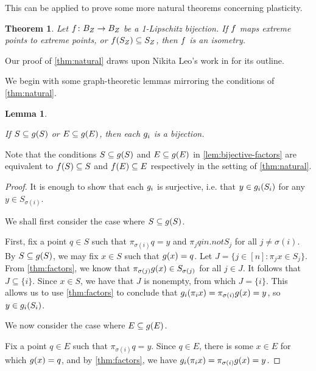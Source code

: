 \documentclass{amsart}
\newtheorem{theorem}{Theorem}[section]
\newtheorem{lemma}{Lemma}[section]
\theoremstyle{definition}
\begin{document}
This can be applied to prove some more natural theorems concerning plasticity.

\begin{theorem} \label{thm:natural}
\annotation
  Let $f\colon B_Z \to B_Z$ be a 1-Lipschitz bijection. If $f$ maps extreme points to extreme points, or $f(S_Z) \subseteq S_Z$, then $f$ is an isometry.
\end{theorem}

Our proof of \autoref{thm:natural} draws upon Nikita Leo's work in \autocite{haller:2022}
for its outline.

We begin with some graph-theoretic lemmas mirroring the conditions of \autoref{thm:natural}.

\begin{lemma} \label{lem:bijective-factors}

  If $S \subseteq g(S)$ or $E \subseteq g(E)$, then each $g_i$ is a bijection.
\end{lemma}

Note that the conditions $S \subseteq g(S)$ and $E \subseteq g(E)$ in \autoref{lem:bijective-factors} are equivalent to $f(S) \subseteq S$ and $f(E) \subseteq E$ respectively in the setting of \autoref{thm:natural}.

\begin{proof} 

  It is enough to show that each $g_i$ is surjective, i.e. that $y \in g_i (S_i)$ for any $y \in S_{\sigma(i)}$.

  We shall first consider the case where $S \subseteq g(S)$.

  First, fix a point $q \in S$ such that $\pi_{\sigma(i)} q = y$ and $\pi_j q in.not S_j$ for all $j \neq \sigma(i)$. By $S \subseteq g(S)$, we may fix $x \in S$ such that $g(x) = q$. Let $J = \{j \in [n] \colon \pi_j x \in S_j\}$. From  \autoref{thm:factors}, we know that $\pi_{\sigma(j)} g(x) \in S_{\sigma(j)}$ for all $j \in J$. It follows that $J \subseteq \{i\}$. Since $x \in S$, we have that $J$ is nonempty, from which $J = \{i\}$. This allows us to use  \autoref{thm:factors} to conclude that $g_i (\pi_i x) = \pi_{\sigma(i)} g(x) = y$, so $y \in g_i (S_i)$.

  We now consider the case where $E \subseteq g(E)$.

  Fix a point $q \in E$ such that $\pi_{\sigma(i)} q = y$. Since $q \in E$, there is some $x \in E$ for which $g(x) = q$, and by  \autoref{thm:factors}, we have $g_i (\pi_i x) = \pi_{\sigma(i)} g(x) = y$.
\end{proof}
\end{document}
